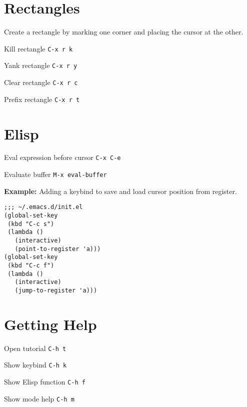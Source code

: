 \documentclass[12pt,a4paper]{article}
\newcommand{\keyboardshortcut}[2]{#1 \hfill \texttt{#2}}
\begin{document}
\vfill\null
\section*{Rectangles}

Create a rectangle by marking one corner and placing the cursor at the other.

\medskip
\keyboardshortcut{Kill rectangle}{C-x r k}

\keyboardshortcut{Yank rectangle}{C-x r y}

\keyboardshortcut{Clear rectangle}{C-x r c}

\keyboardshortcut{Prefix rectangle}{C-x r t}


\section*{Elisp}

\keyboardshortcut{Eval expression before cursor}{C-x C-e}

\keyboardshortcut{Evaluate buffer}{M-x eval-buffer}

\medskip
\textbf{Example:} Adding a keybind to save and load cursor position
from register.

\begin{verbatim}
;;; ~/.emacs.d/init.el
(global-set-key
 (kbd "C-c s")
 (lambda ()
   (interactive)
   (point-to-register 'a)))
(global-set-key
 (kbd "C-c f")
 (lambda ()
   (interactive)
   (jump-to-register 'a)))
\end{verbatim}


\section*{Getting Help}

\keyboardshortcut{Open tutorial}{C-h t}

\keyboardshortcut{Show keybind}{C-h k}

\keyboardshortcut{Show Elisp function}{C-h f}

\keyboardshortcut{Show mode help}{C-h m}
\end{document}
